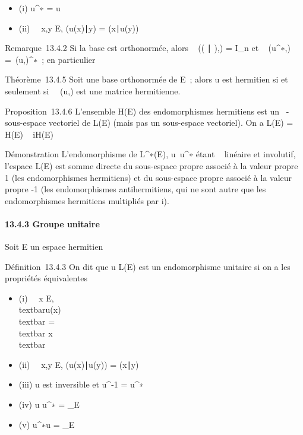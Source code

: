 \documentclass[]{article}
\begin{document}
\begin{itemize}
\itemsep1pt\parskip0pt
\item
  (i) u^∗ = u
\item
  (ii) \forall~~x,y \in E,
  (u(x)∣y) =
  (x∣u(y))
\end{itemize}

Remarque~13.4.2 Si la base  est orthonormée, alors
\mathrmMat~ ((
∣ ),) = I\_n et
\mathrmMat~
(u^∗,) =\
\mathrmMat (u,)^∗~; en particulier

Théorème~13.4.5 Soit  une base orthonormée de E~; alors u est hermitien
si et seulement
si~\mathrmMat~ (u,) est une
matrice hermitienne.

Proposition~13.4.6 L'ensemble H(E) des endomorphismes hermitiens est un
\mathbb{R}~-sous-espace vectoriel de L(E) (mais pas un \mathbb{C} sous-espace vectoriel).
On a L(E) = H(E) \oplus~ iH(E)

Démonstration L'endomorphisme de L^∗(E),
u\mapsto~u^∗ étant ~ linéaire et
involutif, l'espace L(E) est somme directe du sous-espace propre associé
à la valeur propre 1 (les endomorphismes hermitiens) et du sous-espace
propre associé à la valeur propre -1 (les endomorphismes antihermitiens,
qui ne sont autre que les endomorphismes hermitiens multipliés par i).

\paragraph{13.4.3 Groupe unitaire}

Soit E un espace hermitien

Définition~13.4.3 On dit que u \in L(E) est un endomorphisme unitaire si
on a les propriétés équivalentes

\begin{itemize}
\itemsep1pt\parskip0pt
\item
  (i) \forall~~x \in E,
  \\textbar{}u(x)\\textbar{}
  =\\textbar{} x\\textbar{}
\item
  (ii) \forall~~x,y \in E,
  (u(x)∣u(y)) =
  (x∣y)
\item
  (iii) u est inversible et u^-1 = u^∗
\item
  (iv) u \cdot u^∗ = \mathrmId\_E
\item
  (v) u^∗\cdot u = \mathrmId\_E
\end{itemize}
\end{document}
